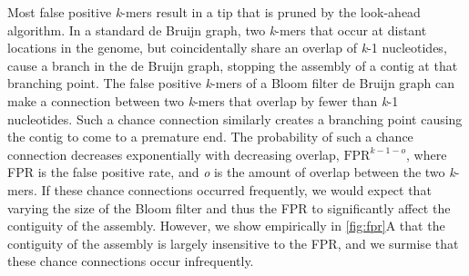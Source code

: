 \documentclass[
  12pt,
  oneside,
  openany]{book}
\begin{document}
Most false positive \emph{k}-mers result in a tip that is pruned by the look-ahead algorithm. In a standard de Bruijn graph, two \emph{k}-mers that occur at distant locations in the genome, but coincidentally share an overlap of \emph{k}-1 nucleotides, cause a branch in the de Bruijn graph, stopping the assembly of a contig at that branching point. The false positive \emph{k}-mers of a Bloom filter de Bruijn graph can make a connection between two \emph{k}-mers that overlap by fewer than \emph{k}-1 nucleotides. Such a chance connection similarly creates a branching point causing the contig to come to a premature end. The probability of such a chance connection decreases exponentially with decreasing overlap, \(\textrm{FPR}^{k-1-o}\), where FPR is the false positive rate, and \emph{o} is the amount of overlap between the two \emph{k}-mers. If these chance connections occurred frequently, we would expect that varying the size of the Bloom filter and thus the FPR to significantly affect the contiguity of the assembly. However, we show empirically in \cref{fig:fpr}A that the contiguity of the assembly is largely insensitive to the FPR, and we surmise that these chance connections occur infrequently.
\end{document}
